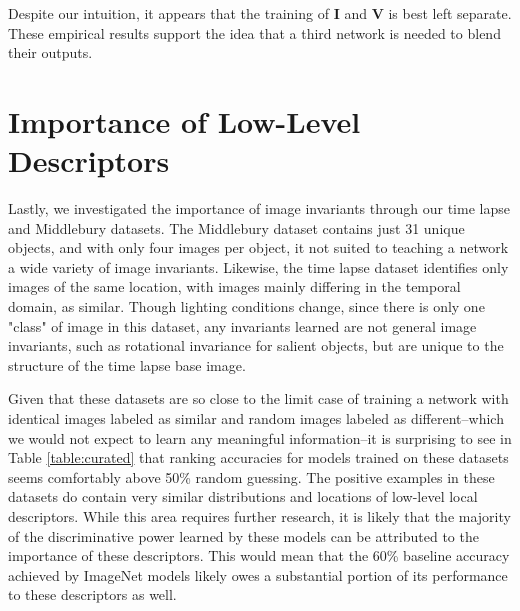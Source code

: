 Despite our intuition, it appears that the training of $\mathbf{I}$ and $\mathbf{V}$ is best left separate. These empirical results support the idea that a third network is needed to blend their outputs.


\section{Importance of Low-Level Descriptors}
Lastly, we investigated the importance of image invariants through our time lapse and Middlebury datasets. The Middlebury dataset contains just 31 unique objects, and with only four images per object, it not suited to teaching a network a wide variety of image invariants. Likewise, the time lapse dataset identifies only images of the same location, with images mainly differing in the temporal domain, as similar. Though lighting conditions change, since there is only one "class" of image in this dataset, any invariants learned are not general image invariants, such as rotational invariance for salient objects, but are unique to the structure of the time lapse base image. 

Given that these datasets are so close to the limit case of training a network with identical images labeled as similar and random images labeled as different--which we would not expect to learn any meaningful information--it is surprising to see in Table \ref{table:curated} that ranking accuracies for models trained on these datasets seems comfortably above 50\% random guessing. The positive examples in these datasets do contain very similar distributions and locations of low-level local descriptors. While this area requires further research, it is likely that the majority of the discriminative power learned by these models can be attributed to the importance of these descriptors. This would mean that the 60\% baseline accuracy achieved by ImageNet models likely owes a substantial portion of its performance to these descriptors as well.


